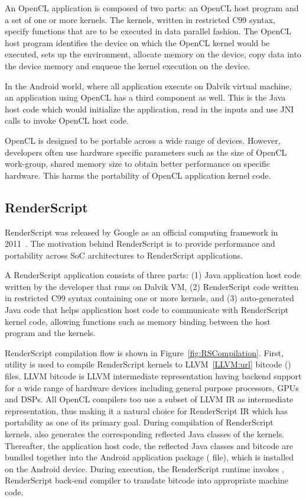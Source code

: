 An OpenCL application is composed of two parts: an OpenCL host program and a
set of one or more kernels. The kernels, written in restricted C99 syntax,
specify functions that are to be executed in data parallel fashion. The OpenCL
host program identifies the device on which the OpenCL kernel would be
executed, sets up the environment, allocate memory on the device, copy data
into the device memory and enqueue the kernel execution on the device.

In the Android world, where all application execute on Dalvik virtual machine,
an application using OpenCL has a third component as well. This is the Java
host code which would initialize the application, read in the inputs and use
JNI calls to invoke OpenCL host code.

OpenCL is designed to be portable across a wide range of devices. However,
developers often use hardware specific parameters such as the size of OpenCL
work-group, shared memory size to obtain better performance on specific
hardware. This harms the portability of OpenCL application kernel code.

\subsection{RenderScript}
RenderScript was released by Google as an official computing framework in
2011~\cite{RederScript:url}. The motivation behind RenderScript is to provide
performance and portability across SoC architectures to RenderScript
applications.

A RenderScript application consists of three parts: (1) Java application host
code written by the developer that runs on Dalvik VM, (2) RenderScript code
written in restricted C99 syntax containing one or more kernels, and (3)
auto-generated Java code that helps application host code to communicate with
RenderScript kernel code, allowing functions such as memory binding between the
host program and the kernels.

RenderScript compilation flow is shown in Figure~\ref{fig:RSCompilation}.
First,  utility is used to compile RenderScript kernels to
LLVM~\ref{LLVM:url} bitcode () files. LLVM bitcode is LLVM
intermediate representation having backend support for a wide range of hardware
devices including general purpose processors, GPUs and DSPs. All OpenCL
compilers too use a subset of LLVM IR as intermediate representation, thus
making it a natural choice for RenderScript IR which has portability as one of
its primary goal. During compilation of RenderScript kernels, 
also generates the corresponding reflected Java classes of the kernels.
Thereafter, the application host code, the reflected Java classes and bitcode
are bundled together into the Android application package ( file),
which is installed on the Android device. During execution, the RenderScript
runtime invokes , RenderScript back-end compiler to translate
bitcode into appropriate machine code.




